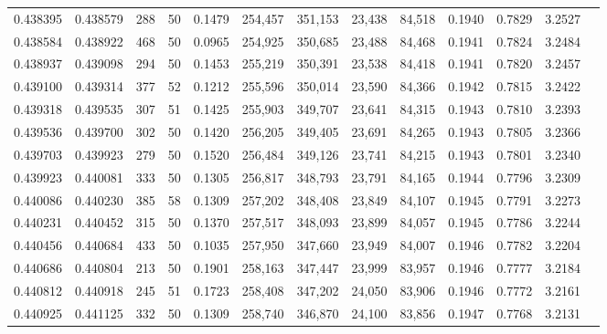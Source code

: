 \begin{tabular}{rrrrrrrrrrrrr}
0.438395 & 0.438579 &   288 &  50 &                                     0.1479 & 254,457 & 351,153 &  23,438 &  84,518 & 0.1940 & 0.7829 & 3.2527 \\
0.438584 & 0.438922 &   468 &  50 &                                     0.0965 & 254,925 & 350,685 &  23,488 &  84,468 & 0.1941 & 0.7824 & 3.2484 \\
0.438937 & 0.439098 &   294 &  50 &                                     0.1453 & 255,219 & 350,391 &  23,538 &  84,418 & 0.1941 & 0.7820 & 3.2457 \\
0.439100 & 0.439314 &   377 &  52 &                                     0.1212 & 255,596 & 350,014 &  23,590 &  84,366 & 0.1942 & 0.7815 & 3.2422 \\
0.439318 & 0.439535 &   307 &  51 &                                     0.1425 & 255,903 & 349,707 &  23,641 &  84,315 & 0.1943 & 0.7810 & 3.2393 \\
0.439536 & 0.439700 &   302 &  50 &                                     0.1420 & 256,205 & 349,405 &  23,691 &  84,265 & 0.1943 & 0.7805 & 3.2366 \\
0.439703 & 0.439923 &   279 &  50 &                                     0.1520 & 256,484 & 349,126 &  23,741 &  84,215 & 0.1943 & 0.7801 & 3.2340 \\
0.439923 & 0.440081 &   333 &  50 &                                     0.1305 & 256,817 & 348,793 &  23,791 &  84,165 & 0.1944 & 0.7796 & 3.2309 \\
0.440086 & 0.440230 &   385 &  58 &                                     0.1309 & 257,202 & 348,408 &  23,849 &  84,107 & 0.1945 & 0.7791 & 3.2273 \\
0.440231 & 0.440452 &   315 &  50 &                                     0.1370 & 257,517 & 348,093 &  23,899 &  84,057 & 0.1945 & 0.7786 & 3.2244 \\
0.440456 & 0.440684 &   433 &  50 &                                     0.1035 & 257,950 & 347,660 &  23,949 &  84,007 & 0.1946 & 0.7782 & 3.2204 \\
0.440686 & 0.440804 &   213 &  50 &                                     0.1901 & 258,163 & 347,447 &  23,999 &  83,957 & 0.1946 & 0.7777 & 3.2184 \\
0.440812 & 0.440918 &   245 &  51 &                                     0.1723 & 258,408 & 347,202 &  24,050 &  83,906 & 0.1946 & 0.7772 & 3.2161 \\
0.440925 & 0.441125 &   332 &  50 &                                     0.1309 & 258,740 & 346,870 &  24,100 &  83,856 & 0.1947 & 0.7768 & 3.2131 \\

\end{tabular}
